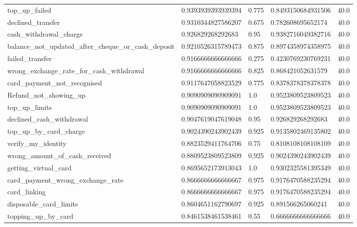 \begin{table}[!ht]
\begin{tabularx}{\textwidth}{X l l l l}
top\_up\_failed & \num{0.9393939393939394} & \num{0.775} & \num{0.8493150684931506} & \num{40.0} \\
declined\_transfer & \num{0.9310344827586207} & \num{0.675} & \num{0.782608695652174} & \num{40.0} \\
cash\_withdrawal\_charge & \num{0.926829268292683} & \num{0.95} & \num{0.9382716049382716} & \num{40.0} \\
balance\_not\_updated\_after\_cheque\_or\_cash\_deposit & \num{0.9210526315789473} & \num{0.875} & \num{0.8974358974358975} & \num{40.0} \\
failed\_transfer & \num{0.9166666666666666} & \num{0.275} & \num{0.4230769230769231} & \num{40.0} \\
wrong\_exchange\_rate\_for\_cash\_withdrawal & \num{0.9166666666666666} & \num{0.825} & \num{0.868421052631579} & \num{40.0} \\
card\_payment\_not\_recognised & \num{0.9117647058823529} & \num{0.775} & \num{0.8378378378378378} & \num{40.0} \\
Refund\_not\_showing\_up & \num{0.9090909090909091} & \num{1.0} & \num{0.9523809523809523} & \num{40.0} \\
top\_up\_limits & \num{0.9090909090909091} & \num{1.0} & \num{0.9523809523809523} & \num{40.0} \\
declined\_cash\_withdrawal & \num{0.9047619047619048} & \num{0.95} & \num{0.926829268292683} & \num{40.0} \\
top\_up\_by\_card\_charge & \num{0.9024390243902439} & \num{0.925} & \num{0.9135802469135802} & \num{40.0} \\
verify\_my\_identity & \num{0.8823529411764706} & \num{0.75} & \num{0.8108108108108109} & \num{40.0} \\
wrong\_amount\_of\_cash\_received & \num{0.8809523809523809} & \num{0.925} & \num{0.9024390243902439} & \num{40.0} \\
getting\_virtual\_card & \num{0.8695652173913043} & \num{1.0} & \num{0.9302325581395349} & \num{40.0} \\
card\_payment\_wrong\_exchange\_rate & \num{0.8666666666666667} & \num{0.975} & \num{0.9176470588235294} & \num{40.0} \\
card\_linking & \num{0.8666666666666667} & \num{0.975} & \num{0.9176470588235294} & \num{40.0} \\
disposable\_card\_limits & \num{0.8604651162790697} & \num{0.925} & \num{0.891566265060241} & \num{40.0} \\
topping\_up\_by\_card & \num{0.8461538461538461} & \num{0.55} & \num{0.6666666666666666} & \num{40.0} \\

\end{tabularx}
\end{table}
